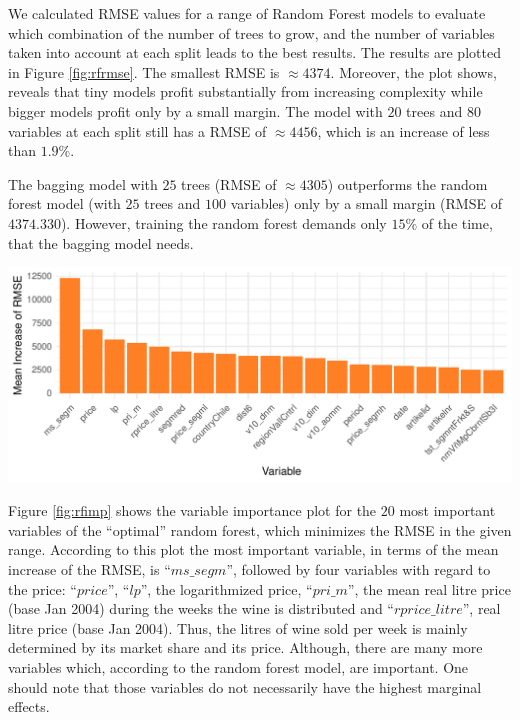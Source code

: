 \documentclass[11pt,]{article}
\let\origfigure\figure
\let\endorigfigure\endfigure
\renewenvironment{figure}[1][2] {
    \expandafter\origfigure\expandafter[H]
} {
    \endorigfigure
}
\begin{document}
We calculated \ac{RMSE} values for a range of Random Forest models to
evaluate which combination of the number of trees to grow, and the
number of variables taken into account at each split leads to the best
results. The results are plotted in Figure \ref{fig:rfrmse}. The
smallest \ac{RMSE} is \(\approx 4374\). Moreover, the plot shows,
reveals that tiny models profit substantially from increasing complexity
while bigger models profit only by a small margin. The model with \(20\)
trees and \(80\) variables at each split still has a \ac{RMSE} of
\(\approx 4456\), which is an increase of less than \(1.9\%\).

The \ac{bagging} model with \(25\) trees (\ac{RMSE} of \(\approx 4305\))
outperforms the random forest model (with \(25\) trees and \(100\)
variables) only by a small margin (\ac{RMSE} of \(4374.330\)). However,
training the random forest demands only \(15\%\) of the time, that the
\ac{bagging} model needs.

\begin{figure}
\centering
\includegraphics{../00_data/output_paper/11_var_imp_random_forest_bp.pdf}
\caption{\label{fig:rfimp}Random Forest: Variable Importance.}
\end{figure}

Figure \ref{fig:rfimp} shows the variable importance plot for the \(20\)
most important variables of the \enquote{optimal} random forest, which
minimizes the \ac{RMSE} in the given range. According to this plot the
most important variable, in terms of the mean increase of the \ac{RMSE},
is \enquote{\(ms\_segm\)}, followed by four variables with regard to the
price: \enquote{\(price\)}, \enquote{\(lp\)}, the logarithmized price,
\enquote{\(pri\_m\)}, the mean real litre price (base Jan 2004) during
the weeks the wine is distributed and \enquote{\(rprice\_litre\)}, real
litre price (base Jan 2004). Thus, the litres of wine sold per week is
mainly determined by its market share and its price. Although, there are
many more variables which, according to the random forest model, are
important. One should note that those variables do not necessarily have
the highest marginal effects.
\end{document}
